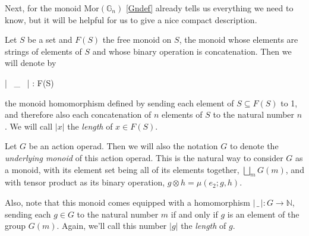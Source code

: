 Next, for the monoid $\mathrm{Mor}(\mathbb{G}_n)$ \cref{Gndef} already tells us everything we need to know, but it will be helpful for us to give a nice compact description.

\begin{defn}\label{lengthdef} Let $S$ be a set and $F(S)$ the free monoid on $S$, the monoid whose elements are strings of elements of $S$ and whose binary operation is concatenation. Then we will denote by
\begin{eq*} | \, \_ \, | : F(S) \to {} \end{eq*}
the monoid homomorphism defined by sending each element of $S \subseteq F(S)$ to 1, and therefore also each concatenation of $n$ elements of $S$ to the natural number $n$. We will call $|x|$ the \emph{length} of $x \in F(S)$.
\end{defn}

\begin{defn} Let $G$ be an action operad. Then we will also the notation $G$ to denote the \emph{underlying monoid} of this action operad. This is the natural way to consider $G$ as a monoid, with its element set being all of its elements together, $\bigsqcup_m G(m)$, and with tensor product as its binary operation, $g \otimes h = \mu(e_2; g, h)$.

Also, note that this monoid comes equipped with a homomorphism $| \, \_ \, | : G \to \mathbb{N}$, sending each $g \in G$ to the natural number $m$ if and only if $g$ is an element of the group $G(m)$. Again, we'll call this number $|g|$ the \emph{length} of $g$.
\end{defn}

